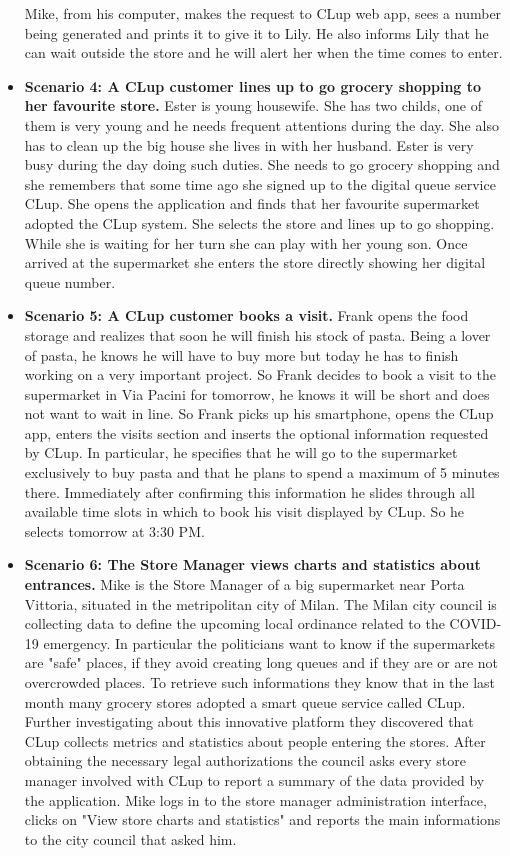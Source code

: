 \begin{itemize}
    Mike, from his computer, makes the request to CLup web app, sees a number being generated and prints it to give it to Lily. He also informs Lily that he can wait outside the store and he will alert her when the time comes to enter.
    \item \textbf{Scenario 4: A CLup customer lines up to go grocery shopping to her favourite store.} Ester is young housewife. She has two childs, one of them is very young and he needs frequent attentions during the day. She also has to clean up the big house she lives in with her husband. Ester is very busy during the day doing such duties. She needs to go grocery shopping and she remembers that some time ago she signed up to the digital queue service CLup. She opens the application and finds that her favourite supermarket adopted the CLup system. 
    She selects the store and lines up to go shopping. While she is waiting for her turn she can play with her young son. Once arrived at the supermarket she enters the store directly showing her digital queue number.
    \item \textbf{Scenario 5: A CLup customer books a visit.} Frank opens the food storage and realizes that soon he will finish his stock of pasta. Being a lover of pasta, he knows he will have to buy more but today he has to finish working on a very important project. So Frank decides to book a visit to the supermarket in Via Pacini for tomorrow, he knows it will be short and does not want to wait in line. So Frank picks up his smartphone, opens the CLup app, enters the visits section and inserts the optional information requested by CLup. In particular, he specifies that he will go to the supermarket exclusively 
    to buy pasta and that he plans to spend a maximum of 5 minutes there. Immediately after confirming this information he slides through all available time slots in which to book his visit displayed by CLup. So he selects tomorrow at 3:30 PM. 
    \item \textbf{Scenario 6: The Store Manager views charts and statistics about entrances.} Mike is the Store Manager of a big supermarket near Porta Vittoria, situated in the metripolitan city of Milan. The Milan city council is collecting data to define the upcoming local ordinance related to the COVID-19 emergency. In particular the politicians want to know if the supermarkets are "safe" places, if they avoid creating long queues and if they are or are not overcrowded places. 
    To retrieve such informations they know that in the last month many grocery stores adopted a smart queue service called CLup. Further investigating about this innovative platform they discovered that CLup collects metrics and statistics about people entering the stores. After obtaining the necessary legal authorizations the council asks every store manager involved with CLup to report a summary of the data provided by the application. Mike logs in to the store manager administration interface, clicks on "View store charts and statistics" and reports the main informations to the city council that asked him.

\end{itemize}

